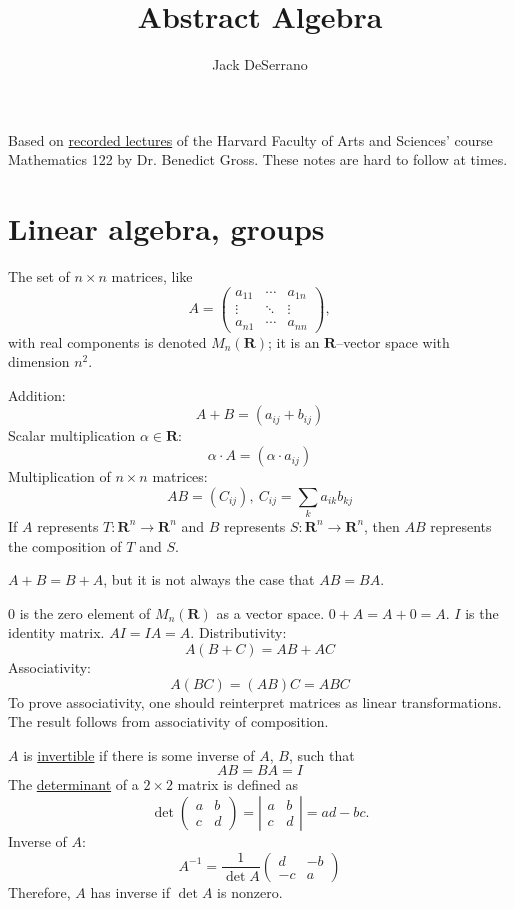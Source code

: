 \documentclass[11pt, oneside]{amsart}
\title{Abstract Algebra}
\author{Jack DeSerrano}
\numberwithin{equation}{section}
\numberwithin{theorem}{section}
\theoremstyle{definition}
\def\R{\mathbf{R}}
\begin{document}
\maketitle
Based on \href{http://wayback.archive-it.org/3671/20150528171650/https://www.extension.harvard.edu/open-learning-initiative/abstract-algebra}{recorded lectures} of the Harvard Faculty of Arts and Sciences' course Mathematics 122 by Dr. Benedict Gross. These notes are hard to follow at times.
\tableofcontents



\section{Linear algebra, groups}
The set of $n\times n$ matrices, like
$$
A = \begin{pmatrix} a_{11} &\cdots&a_{1n}\\\vdots & \ddots & \vdots \\ a_{n1} & \cdots & a_{nn}\end{pmatrix},
$$
with real components is denoted $M_n(\R)$; it is an $\R$--vector space with dimension $n^2$.

Addition:
$$
A + B = (a_{ij} + b_{ij})
$$
Scalar multiplication $\alpha\in\R$:
$$
\alpha\cdot A = (\alpha \cdot a_{ij})
$$
Multiplication of $n \times n$ matrices:
$$
AB = (C_{ij}),\  C_{ij} = \sum_k a_{ik}b_{k j}
$$
If $A$ represents $T:\R^n \rightarrow \R^n$ and $B$ represents $S:\R^n \rightarrow \R^n$, then $AB$ represents the composition of $T$ and $S$. 


$A+B=B+A$, but it is not always the case that $AB= BA$. 


$0$
is the zero element of $M_n(\R)$ as a vector space. $0+A=A+0=A$.
$I$ is the identity matrix. $AI = IA = A$. Distributivity:
$$
A(B+C) = AB+AC
$$
Associativity:
$$
A(BC) =(AB)C = ABC
$$ 
To prove associativity, one should reinterpret matrices as linear transformations. The result follows from associativity of composition.

$A$ is \underline{invertible} if there is some inverse of $A$,  $B$, such that
$$
AB = BA = I
$$
The \underline{determinant} of a $2\times 2$ matrix is defined as
$$
\det \begin{pmatrix}{a}&{b}\\{c}&{d}\end{pmatrix} = \left | \begin{matrix}{a}&{b}\\{c}&{d}\end{matrix}  \right | = ad-bc.
$$
Inverse of $A$:
$$
A^{-1} = \frac{1}{\det A} \begin{pmatrix}{d}&{-b}\\{-c}&{a}\end{pmatrix} 
$$
Therefore, $A$ has inverse if $\det A$ is nonzero. 
\end{document}
